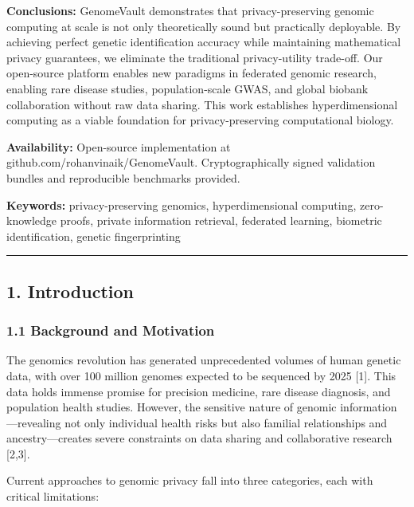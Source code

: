 \documentclass[
  11pt,
]{article}
\begin{document}
\textbf{Conclusions:} GenomeVault demonstrates that privacy-preserving
genomic computing at scale is not only theoretically sound but
practically deployable. By achieving perfect genetic identification
accuracy while maintaining mathematical privacy guarantees, we eliminate
the traditional privacy-utility trade-off. Our open-source platform
enables new paradigms in federated genomic research, enabling rare
disease studies, population-scale GWAS, and global biobank collaboration
without raw data sharing. This work establishes hyperdimensional
computing as a viable foundation for privacy-preserving computational
biology.

\textbf{Availability:} Open-source implementation at
github.com/rohanvinaik/GenomeVault. Cryptographically signed validation
bundles and reproducible benchmarks provided.

\textbf{Keywords:} privacy-preserving genomics, hyperdimensional
computing, zero-knowledge proofs, private information retrieval,
federated learning, biometric identification, genetic fingerprinting

\begin{center}\rule{0.5\linewidth}{0.5pt}\end{center}

\subsection{1. Introduction}\label{introduction}

\subsubsection{1.1 Background and
Motivation}\label{background-and-motivation}

The genomics revolution has generated unprecedented volumes of human
genetic data, with over 100 million genomes expected to be sequenced by
2025 {[}1{]}. This data holds immense promise for precision medicine,
rare disease diagnosis, and population health studies. However, the
sensitive nature of genomic information---revealing not only individual
health risks but also familial relationships and ancestry---creates
severe constraints on data sharing and collaborative research {[}2,3{]}.

Current approaches to genomic privacy fall into three categories, each
with critical limitations:
\end{document}
